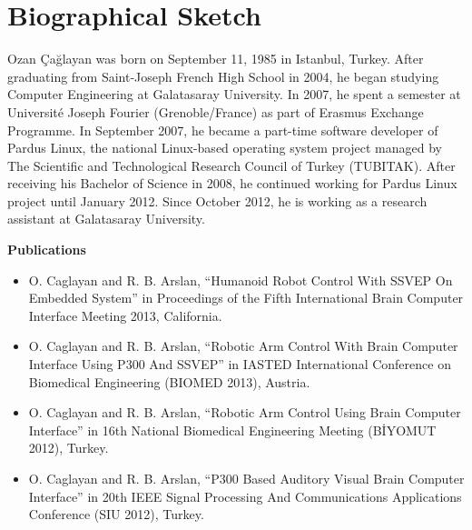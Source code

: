 \documentclass[12pt]{article}
\numberwithin{equation}{section}
\numberwithin{figure}{section}
\numberwithin{table}{section}
\begin{document}
\section*{Biographical Sketch}
\vspace*{6pt}
\par{
    Ozan Çağlayan was born on September 11, 1985 in Istanbul, Turkey. After graduating from Saint-Joseph French High School in 2004,
    he began studying Computer Engineering at Galatasaray University. In 2007, he spent a semester at Université Joseph Fourier (Grenoble/France) as part of Erasmus Exchange Programme.
    In September 2007, he became a part-time software developer of Pardus Linux, the national Linux-based operating system project
    managed by The Scientific and Technological Research Council of Turkey (TUBITAK). After receiving his Bachelor of Science in 2008, he continued working for Pardus Linux project until January 2012.
    Since October 2012, he is working as a research assistant at Galatasaray University.
}
\par{
    \textbf{Publications}
    \begin{itemize}
        \item O. Caglayan and R. B. Arslan, “Humanoid Robot Control With SSVEP On Embedded System” in Proceedings of the Fifth International Brain Computer Interface Meeting 2013, California.
        \item O. Caglayan and R. B. Arslan, “Robotic Arm Control With Brain Computer Interface Using P300 And SSVEP” in IASTED International Conference on Biomedical Engineering (BIOMED 2013), Austria.
        \item O. Caglayan and R. B. Arslan, “Robotic Arm Control Using Brain Computer Interface” in 16th National Biomedical Engineering Meeting (BİYOMUT 2012), Turkey.
        \item O. Caglayan and R. B. Arslan, “P300 Based Auditory Visual Brain Computer Interface” in 20th IEEE Signal Processing And Communications Applications Conference (SIU 2012), Turkey.
    \end{itemize}
}

\clearpage
\end{document}
